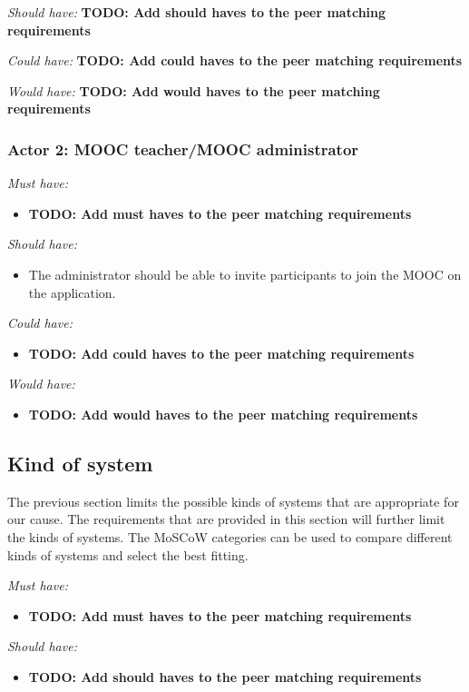 \documentclass[]{article}
\newcommand{\TODO}[1]{{\color{red}\textbf{TODO: #1}}}
\begin{document}
\emph{Should have:}
\TODO{Add should haves to the peer matching requirements}

\emph{Could have:}
\TODO{Add could haves to the peer matching requirements}

\emph{Would have:}
\TODO{Add would haves to the peer matching requirements}

\subsubsection{Actor 2: MOOC teacher/MOOC administrator}
\emph{Must have:}
\begin{itemize}
\item \TODO{Add must haves to the peer matching requirements}
\end{itemize}

\emph{Should have:}
\begin{itemize}
\item The administrator should be able to invite participants to join the MOOC on the application.
\end{itemize}

\emph{Could have:}
\begin{itemize}
\item \TODO{Add could haves to the peer matching requirements}
\end{itemize}

\emph{Would have:}
\begin{itemize}
\item \TODO{Add would haves to the peer matching requirements}
\end{itemize}

\subsection{Kind of system}
The previous section limits the possible kinds of systems that are appropriate for our cause.
The requirements that are provided in this section will further limit the kinds of systems.
The MoSCoW categories can be used to compare different kinds of systems and select the best fitting.

\emph{Must have:}
\begin{itemize}
\item \TODO{Add must haves to the peer matching requirements}
\end{itemize}

\emph{Should have:}
\begin{itemize}
\item \TODO{Add should haves to the peer matching requirements}
\end{itemize}
\end{document}
